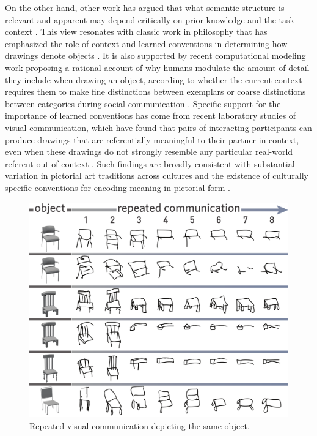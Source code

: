 \documentclass[11pt,letterpaper]{article}
\begin{document}
On the other hand, other work has argued that what semantic structure is relevant and apparent may depend critically on prior knowledge and the task context \cite{schyns1998development,goldstone1998perceptual}.
This view resonates with classic work in philosophy that has emphasized the role of context and learned conventions in determining how drawings denote objects \cite{goodman1976languages}.
It is also supported by recent computational modeling work proposing a rational account of why humans modulate the amount of detail they include when drawing an object, according to whether the current context requires them to make fine distinctions between exemplars or coarse distinctions between categories during social communication \cite{fan2020pragmatic}.
Specific support for the importance of learned conventions has come from recent laboratory studies of visual communication, which have found that pairs of interacting participants can produce drawings that are referentially meaningful to their partner in context, even when these drawings do not strongly resemble any particular real-world referent out of context \cite{garrod_foundations_2007,fay2010interactive,GalantucciGarrod11_ExperimentalSemiotics,galantucci2005experimental}.
Such findings are broadly consistent with substantial variation in pictorial art traditions across cultures \cite{gombrich1989story} and the existence of culturally specific conventions for encoding meaning in pictorial form \cite{boltz1994origin,allen2000middle}.

\begin{figure}
\begin{center}
\includegraphics[width=0.7\linewidth]{figures/sketch_gallery.pdf}
\caption{Repeated visual communication depicting the same object.}
\label{sketch_gallery}
\end{center}
\end{figure}
\end{document}
